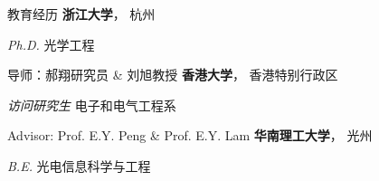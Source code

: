 \begin{rubric}{教育经历}
	\entry*[2018/09 -- 2023/12]%
	\textbf{浙江大学}， 杭州
	\par \textit{Ph.D.} 光学工程
	\par 导师：郝翔研究员 \& 刘旭教授
\entry*[2022/12 -- 2023/04]%
	\textbf{香港大学}， 香港特别行政区
	\par \textit{访问研究生} 电子和电气工程系
	\par Advisor: Prof. E.Y. Peng \& Prof. E.Y. Lam
\entry*[2014/09 -- 2018/06]%
	\textbf{华南理工大学}， 光州
	\par \textit{B.E.} 光电信息科学与工程
\end{rubric}